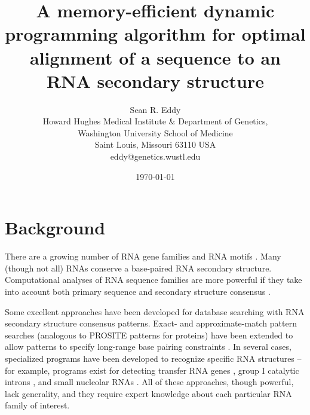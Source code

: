 \documentclass[11pt]{article}
\begin{document}
\title{A memory-efficient dynamic programming algorithm for optimal
alignment of a sequence to an RNA secondary structure}
\author{Sean R. Eddy\\
Howard Hughes Medical Institute \& Department of Genetics, \\
Washington University School of Medicine \\
Saint Louis, Missouri 63110 USA \\
eddy@genetics.wustl.edu}  
\date{\today}
\maketitle


\section{Background}

There are a growing number of RNA gene families and RNA motifs
\cite{Eddy01,Erdmann01}. Many (though not all) RNAs conserve a
base-paired RNA secondary structure. Computational analyses of RNA
sequence families are more powerful if they take into account both
primary sequence and secondary structure consensus
\cite{Eddy02,Dandekar95}. 

Some excellent approaches have been developed for database searching
with RNA secondary structure consensus patterns. Exact- and
approximate-match pattern searches (analogous to PROSITE patterns for
proteins) have been extended to allow patterns to specify long-range
base pairing constraints \cite{Laferriere94,Dsouza97}. In several
cases, specialized programs have been developed to recognize specific
RNA structures \cite{Dandekar95} -- for example, programs exist for
detecting transfer RNA genes
\cite{Fichant91,El-MabroukLisacek96,LoweEddy97}, group I catalytic
introns \cite{Lisacek94}, and small nucleolar RNAs
\cite{Nicoloso96,LoweEddy98}. All of these approaches, though
powerful, lack generality, and they require expert knowledge about
each particular RNA family of interest.
\end{document}
